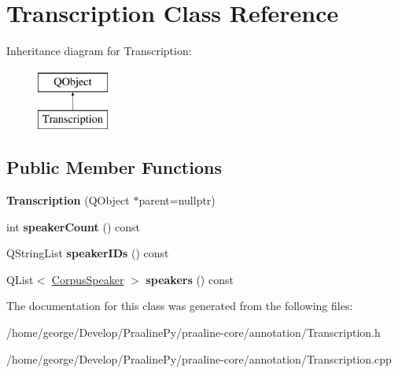 \hypertarget{class_transcription}{}\section{Transcription Class Reference}
\label{class_transcription}
Inheritance diagram for Transcription\+:\begin{figure}[H]
\begin{center}
\leavevmode
\includegraphics[height=2.000000cm]{class_transcription}
\end{center}
\end{figure}
\subsection*{Public Member Functions}
\begin{DoxyCompactItemize}
\item 
\mbox{\label{class_transcription_a2aab445a96344bcf46c2b66fe0a22e53}} 
{\bfseries Transcription} (Q\+Object $\ast$parent=nullptr)
\item 
\mbox{\label{class_transcription_af11a9b5fec30e3f90e6b189b7166dcaa}} 
int {\bfseries speaker\+Count} () const
\item 
\mbox{\label{class_transcription_ad73bd10fc69732034770457f3e131fd4}} 
Q\+String\+List {\bfseries speaker\+I\+Ds} () const
\item 
\mbox{\label{class_transcription_a3a583b9e5061617eb926dbcd189d791b}} 
Q\+List$<$ \hyperlink{class_corpus_speaker}{Corpus\+Speaker} $>$ {\bfseries speakers} () const
\end{DoxyCompactItemize}


The documentation for this class was generated from the following files\+:\begin{DoxyCompactItemize}
\item 
/home/george/\+Develop/\+Praaline\+Py/praaline-\/core/annotation/Transcription.\+h\item 
/home/george/\+Develop/\+Praaline\+Py/praaline-\/core/annotation/Transcription.\+cpp\end{DoxyCompactItemize}
